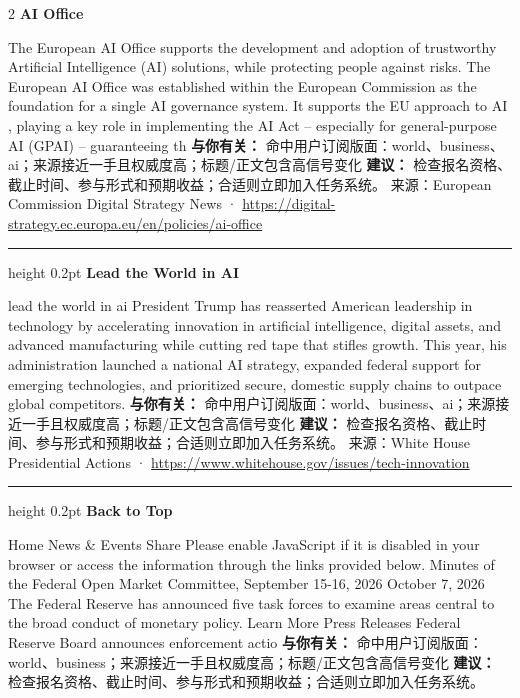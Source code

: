 \documentclass[10.5pt]{ctexart}
\begin{document}
\begin{multicols}{2}
{\large\bfseries AI Office}\par
The European AI Office supports the development and adoption of trustworthy Artificial Intelligence (AI) solutions, while protecting people against risks. The European AI Office was established within the European Commission as the foundation for a single AI governance system. It supports the EU approach to AI , playing a key role in implementing the AI Act – especially for general-purpose AI (GPAI) – guaranteeing th
\textbf{与你有关：} 命中用户订阅版面：world、business、ai；来源接近一手且权威度高；标题/正文包含高信号变化
\textbf{建议：} 检查报名资格、截止时间、参与形式和预期收益；合适则立即加入任务系统。
{\footnotesize\color{ormuted} 来源：European Commission Digital Strategy News · \url{https://digital-strategy.ec.europa.eu/en/policies/ai-office}}
\vspace{2mm}
\hrule height 0.2pt
\vspace{2mm}
{\large\bfseries Lead the World in AI}\par
lead the world in ai President Trump has reasserted American leadership in technology by accelerating innovation in artificial intelligence, digital assets, and advanced manufacturing while cutting red tape that stifles growth. This year, his administration launched a national AI strategy, expanded federal support for emerging technologies, and prioritized secure, domestic supply chains to outpace global competitors.
\textbf{与你有关：} 命中用户订阅版面：world、business、ai；来源接近一手且权威度高；标题/正文包含高信号变化
\textbf{建议：} 检查报名资格、截止时间、参与形式和预期收益；合适则立即加入任务系统。
{\footnotesize\color{ormuted} 来源：White House Presidential Actions · \url{https://www.whitehouse.gov/issues/tech-innovation}}
\vspace{2mm}
\hrule height 0.2pt
\vspace{2mm}
{\large\bfseries Back to Top}\par
Home News \& Events Share Please enable JavaScript if it is disabled in your browser or access the information through the links provided below. Minutes of the Federal Open Market Committee, September 15-16, 2026 October 7, 2026 The Federal Reserve has announced five task forces to examine areas central to the broad conduct of monetary policy. Learn More Press Releases Federal Reserve Board announces enforcement actio
\textbf{与你有关：} 命中用户订阅版面：world、business；来源接近一手且权威度高；标题/正文包含高信号变化
\textbf{建议：} 检查报名资格、截止时间、参与形式和预期收益；合适则立即加入任务系统。

\end{multicols}
\end{document}
